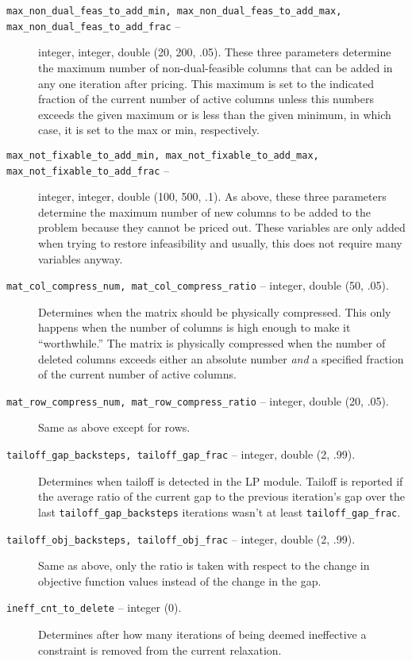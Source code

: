\begin{description}
\item[{\tt max\_non\_dual\_feas\_to\_add\_min,
max\_non\_dual\_feas\_to\_add\_max,
max\_non\_dual\_feas\_to\_add\_frac} --] integer, integer, double (20,
200, .05).
These three parameters determine the maximum number of
non-dual-feasible columns that can be added in any one iteration
after pricing. This maximum is set to the indicated
fraction of the current number of active columns unless this numbers
exceeds the given maximum or is less than the given minimum, in which
case, it is set to the max or min, respectively.

\item[{\tt max\_not\_fixable\_to\_add\_min,
max\_not\_fixable\_to\_add\_max,
max\_not\_fixable\_to\_add\_frac} --] integer, integer, double (100,
500, .1).
As above, these three parameters determine the maximum number of new
columns to be added to the problem because they cannot be priced out.
These variables are only added when trying to restore infeasibility
and usually, this does not require many variables anyway.

\item[{\tt mat\_col\_compress\_num, mat\_col\_compress\_ratio} -- integer,
double (50, .05).]
Determines when the matrix should be physically compressed. This only
happens when the number of columns is high enough to make it
``worthwhile.'' The matrix is physically compressed when the number of
deleted columns exceeds either an absolute number {\em and} a specified
fraction of the current number of active columns.

\item[{\tt mat\_row\_compress\_num, mat\_row\_compress\_ratio} -- integer,
double (20, .05).]
Same as above except for rows.

\item[{\tt tailoff\_gap\_backsteps, tailoff\_gap\_frac} -- integer, double
(2, .99).]
Determines when tailoff is detected in the LP module.
Tailoff is reported if the average ratio of the current gap to the
previous iteration's gap over the last {\tt tailoff\_gap\_backsteps}
iterations wasn't at least {\tt tailoff\_gap\_frac}.

\item[{\tt tailoff\_obj\_backsteps, tailoff\_obj\_frac} -- integer, double
(2, .99).]
Same as above, only the ratio is taken with respect to the change in
objective function values instead of the change in the gap.

\item[{\tt ineff\_cnt\_to\_delete} -- integer (0).]
Determines after how many iterations of being deemed ineffective a
constraint is removed from the current relaxation.


\end{description}
